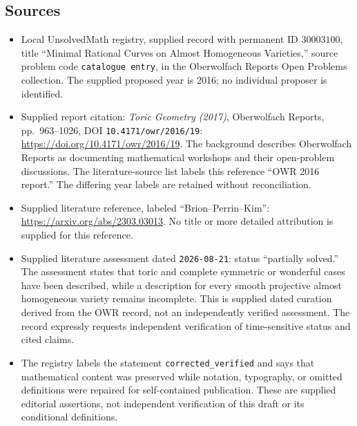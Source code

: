 \documentclass[11pt]{article}
\begin{document}
\subsection{Sources}
\begin{itemize}
\item Local UnsolvedMath registry, supplied record with permanent ID \(30003100\), title ``Minimal Rational Curves on Almost Homogeneous Varieties,'' source problem code \texttt{catalogue entry}, in the Oberwolfach Reports Open Problems collection. The supplied proposed year is 2016; no individual proposer is identified.
\item Supplied report citation: \emph{Toric Geometry (2017)}, Oberwolfach Reports, pp.\ 963--1026, DOI \texttt{10.4171/owr/2016/19}: \url{https://doi.org/10.4171/owr/2016/19}. The background describes Oberwolfach Reports as documenting mathematical workshops and their open-problem discussions. The literature-source list labels this reference ``OWR 2016 report.'' The differing year labels are retained without reconciliation.
\item Supplied literature reference, labeled ``Brion--Perrin--Kim'': \url{https://arxiv.org/abs/2303.03013}. No title or more detailed attribution is supplied for this reference.
\item Supplied literature assessment dated \texttt{2026-08-21}: status ``partially solved.'' The assessment states that toric and complete symmetric or wonderful cases have been described, while a description for every smooth projective almost homogeneous variety remains incomplete. This is supplied dated curation derived from the OWR record, not an independently verified assessment. The record expressly requests independent verification of time-sensitive status and cited claims.
\item The registry labels the statement \texttt{corrected\_verified} and says that mathematical content was preserved while notation, typography, or omitted definitions were repaired for self-contained publication. These are supplied editorial assertions, not independent verification of this draft or its conditional definitions.
\end{itemize}
\end{document}
